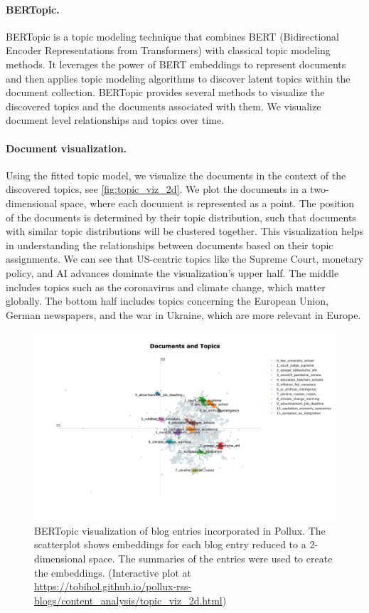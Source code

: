 \documentclass{article}
\begin{document}
\paragraph{BERTopic.}
BERTopic \citep{grootendorstBERTopicNeuralTopic2022} is a topic modeling technique that combines BERT (Bidirectional Encoder Representations from Transformers) with classical topic modeling methods. It leverages the power of BERT embeddings to represent documents and then applies topic modeling algorithms to discover latent topics within the document collection.
BERTopic provides several methods to visualize the discovered topics and the documents associated with them. We visualize document level relationships and topics over time.

\paragraph{Document visualization.}
Using the fitted topic model, we visualize the documents in the context of the discovered topics, see \autoref{fig:topic_viz_2d}. We plot the documents in a two-dimensional space, where each document is represented as a point. The position of the documents is determined by their topic distribution, such that documents with similar topic distributions will be clustered together. This visualization helps in understanding the relationships between documents based on their topic assignments. We can see that US-centric topics like the Supreme Court, monetary policy, and AI advances dominate the visualization's upper half. The middle includes topics such as the coronavirus and climate change, which matter globally. The bottom half includes topics concerning the European Union, German newspapers, and the war in Ukraine, which are more relevant in Europe.

\begin{figure}[!htb]
    \includegraphics[width=1.0\textwidth]{figures/topic_viz_2d.png}
    \caption{BERTopic visualization of blog entries incorporated in Pollux. The scatterplot shows embeddings for each blog entry reduced to a 2-dimensional space. The summaries of the entries were used to create the embeddings. (Interactive plot at \url{https://tobihol.github.io/pollux-rss-blogs/content_analysis/topic_viz_2d.html})}
    \label{fig:topic_viz_2d}
\end{figure}
\end{document}
